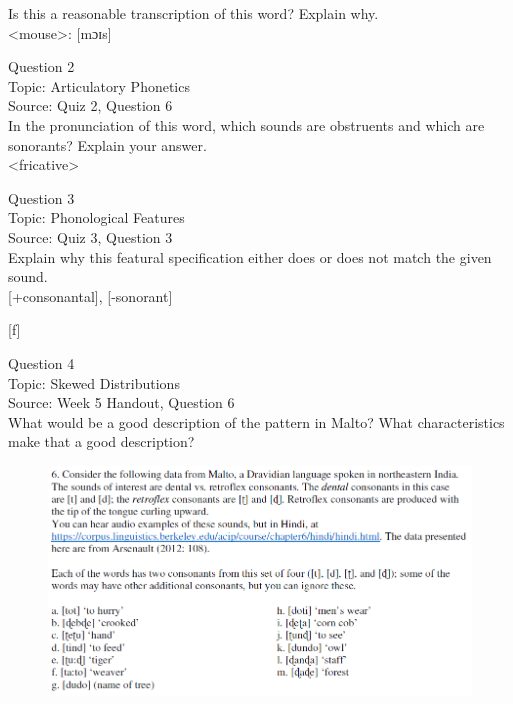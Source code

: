 \documentclass[12pt]{article}
\begin{document}
Is this a reasonable transcription of this word? Explain why.\\

<mouse>: {[mɔɪs]}


\newpage

{\large Question 2}\\

Topic: Articulatory Phonetics\\
Source: Quiz 2, Question 6\\

In the pronunciation of this word, which sounds are obstruents and which are sonorants? Explain your answer.\\

<fricative>


\newpage

{\large Question 3}\\

Topic: Phonological Features\\
Source: Quiz 3, Question 3\\

Explain why this featural specification either does or does not match the given sound.\\

{[+consonantal]}, {[-sonorant]}

{[f]}


\newpage

{\large Question 4}\\

Topic: Skewed Distributions\\
Source: Week 5 Handout, Question 6\\

What would be a good description of the pattern in Malto? What characteristics make that a good description?\\

\begin{figure}[H]
\includegraphics{../images/malto.png}
\end{figure}
\end{document}
